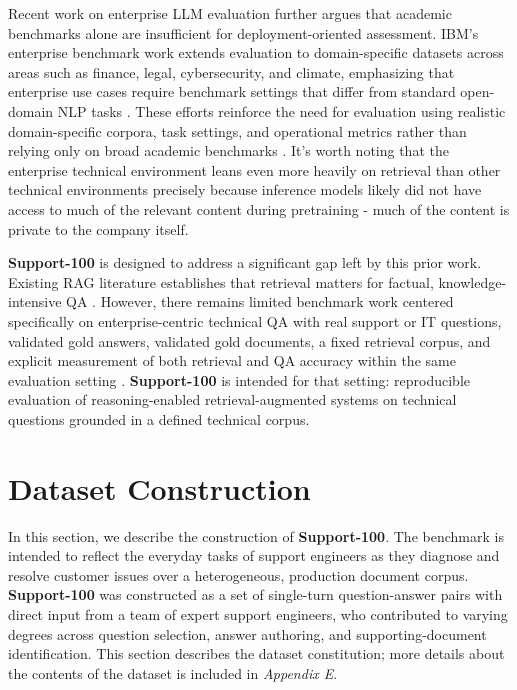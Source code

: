 \documentclass[11pt]{article}
\begin{document}
Recent work on enterprise LLM evaluation further argues that academic
benchmarks alone are insufficient for deployment-oriented assessment.
IBM's enterprise benchmark work extends evaluation to domain-specific
datasets across areas such as finance, legal, cybersecurity, and
climate, emphasizing that enterprise use cases require benchmark
settings that differ from standard open-domain NLP tasks \citep{zhang2025}. 
These efforts reinforce the need for evaluation using realistic
domain-specific corpora, task settings, and operational metrics rather
than relying only on broad academic benchmarks \citep{zhang2025}. It's worth 
noting that the enterprise technical environment leans even more heavily on 
retrieval than other technical environments precisely because inference models 
likely did not have access to much of the relevant content during pretraining 
- much of the content is private to the company itself.

\textbf{Support-100} is designed to address a significant gap left by this prior
work. Existing RAG literature establishes that retrieval matters for
factual, knowledge-intensive QA
\citep{borgeaud2022}\citep{lewis2020}\citep{cohen2025}.
However, there remains limited benchmark work
centered specifically on enterprise-centric technical QA with real
support or IT questions, validated gold answers, validated gold documents, a 
fixed retrieval corpus, and explicit measurement of both retrieval and QA 
accuracy within the same evaluation setting 
\citep{castelli2020}\citep{cohen2025}. \textbf{Support-100} is intended for that 
setting: reproducible evaluation of reasoning-enabled retrieval-augmented 
systems on technical questions grounded in a defined technical corpus.

\section{Dataset Construction}

In this section, we describe the construction of \textbf{Support-100}. The
benchmark is intended to reflect the everyday tasks of support
engineers as they diagnose and resolve customer issues over a
heterogeneous, production document corpus. \textbf{Support-100} was
constructed as a set of single-turn question-answer pairs with direct
input from a team of expert support engineers, who contributed
to varying degrees across question selection, answer authoring, and
supporting-document identification. This section describes the dataset
constitution; more details about the contents of the dataset is included in 
\textit{Appendix E}.
\end{document}
